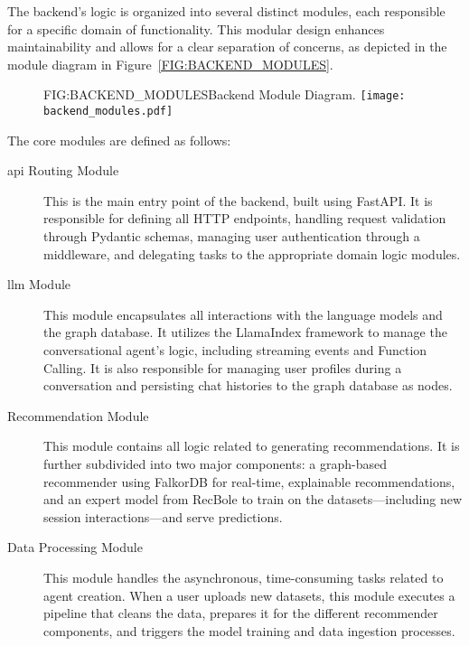 The backend's logic is organized into several distinct modules, each responsible for a specific domain of functionality. This modular design enhances maintainability and allows for a clear separation of concerns, as depicted in the module diagram in Figure~\ref{FIG:BACKEND_MODULES}.

\begin{figure}[Backend Module Diagram]{FIG:BACKEND_MODULES}{Backend Module Diagram.}
    \texttt{[image: backend\_modules.pdf]}
\end{figure}

The core modules are defined as follows:
\begin{description}
    \item[\acs{api} Routing Module] This is the main entry point of the backend, built using FastAPI. It is responsible for defining all HTTP endpoints, handling request validation through Pydantic schemas, managing user authentication through a middleware, and delegating tasks to the appropriate domain logic modules.

    \item[\acs{llm} Module] This module encapsulates all interactions with the language models and the graph database. It utilizes the LlamaIndex framework to manage the conversational agent's logic, including streaming events and Function Calling. It is also responsible for managing user profiles during a conversation and persisting chat histories to the graph database as nodes.

    \item[Recommendation Module] This module contains all logic related to generating recommendations. It is further subdivided into two major components: a graph-based recommender using FalkorDB for real-time, explainable recommendations, and an expert model from RecBole to train on the datasets---including new session interactions---and serve predictions.

    \item[Data Processing Module] This module handles the asynchronous, time-consuming tasks related to agent creation. When a user uploads new datasets, this module executes a pipeline that cleans the data, prepares it for the different recommender components, and triggers the model training and data ingestion processes.
\end{description}